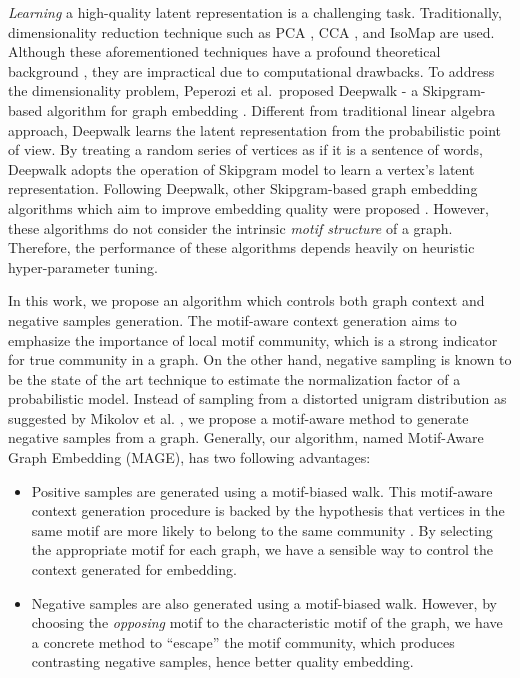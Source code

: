 \documentclass[letterpaper]{article}
\begin{document}

        \emph{Learning} a high-quality latent representation is a challenging task. Traditionally,
        dimensionality reduction technique such as PCA \cite{pca}, CCA \cite{cca}, and IsoMap 
        \cite{isomap} are used. Although these aforementioned techniques have a profound theoretical
        background \cite{++++++}, they are impractical due to computational drawbacks. To address
        the dimensionality problem, Peperozi et al.\ proposed Deepwalk - a Skipgram-based algorithm
        for graph embedding \cite{deepwalk}. Different from traditional linear algebra approach,
        Deepwalk learns the latent representation from the probabilistic point of view. By treating
        a random series of vertices as if it is a sentence of words, Deepwalk adopts the operation
        of Skipgram model \cite{skipgram} to learn a vertex's latent representation. Following
        Deepwalk, other Skipgram-based graph embedding algorithms which aim to improve embedding
        quality were proposed \cite{GraRep, LINE, platenoid, node2vec}. However, these algorithms
        do not consider the intrinsic \emph{motif structure} of a graph. Therefore, the performance
        of these algorithms depends heavily on heuristic hyper-parameter tuning.


        In this work, we propose an algorithm which controls both graph context and negative samples
        generation. The motif-aware context generation aims to emphasize the importance of local
        motif community, which is a strong indicator for true community in a graph. On the other hand,
        negative sampling is known to be the state of the art technique to estimate the normalization
        factor of a probabilistic model. Instead of sampling from a distorted unigram distribution as
        suggested by Mikolov et al. \cite{skipgram}, we propose a motif-aware method to generate 
        negative samples from a graph. Generally, our algorithm, named Motif-Aware Graph Embedding (MAGE),
        has two following advantages:

        \begin{itemize}
            \setlength{\parskip}{0pt}
            \item Positive samples are generated using a motif-biased walk. This motif-aware context 
                generation procedure is backed by the hypothesis that vertices in the same motif
                are more likely to belong to the same community \cite{juremotif, harvardmotif}.
                By selecting the appropriate motif for each graph, we have a sensible way to control
                the context generated for embedding.
            \item Negative samples are also generated using a motif-biased walk. However, by choosing
                the \emph{opposing} motif to the characteristic motif of the graph, we have a concrete
                method to ``escape'' the motif community, which produces contrasting negative
                samples, hence better quality embedding.
        \end{itemize}
\end{document}
